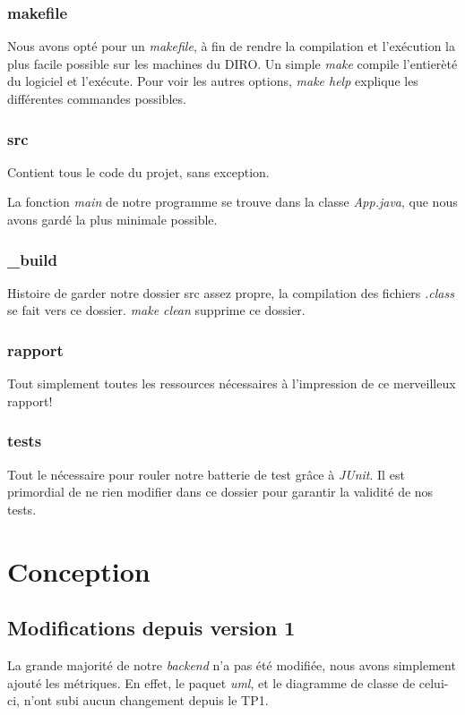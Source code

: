 \documentclass[letter,french]{report}
\begin{document}
	\subsubsection*{makefile}
	Nous avons opté pour un \emph{makefile}, à fin de rendre la compilation et l'exécution
	la plus facile possible sur les machines du DIRO. Un simple \emph{make} compile
	l'entierèté du logiciel et l'exécute. Pour voir les autres options, \emph{make help}
	explique les différentes commandes possibles.

	\subsubsection*{src}
  Contient tous le code du projet, sans exception. 

  La fonction \emph{main} de notre programme se trouve dans la classe
  \emph{App.java}, que nous avons gardé la plus minimale possible.

	\subsubsection*{\_build}
  Histoire de garder notre dossier src assez propre, la compilation des fichiers
  \emph{.class} se fait vers ce dossier. \emph{make clean} supprime ce dossier.

	\subsubsection*{rapport}
  Tout simplement toutes les ressources nécessaires à l'impression de ce
  merveilleux rapport!

  \subsubsection*{tests}
  Tout le nécessaire pour rouler notre batterie de test grâce à \emph{JUnit}. Il
  est primordial de ne rien modifier dans ce dossier pour garantir la validité
  de nos tests.
	
	\section*{Conception}

  \subsection*{Modifications depuis version 1}

  La grande majorité de notre \emph{backend} n'a pas été modifiée, nous avons
  simplement ajouté les métriques. En effet, le paquet \emph{uml}, et le
  diagramme de classe de celui-ci, n'ont subi aucun changement depuis le TP1.
\end{document}
